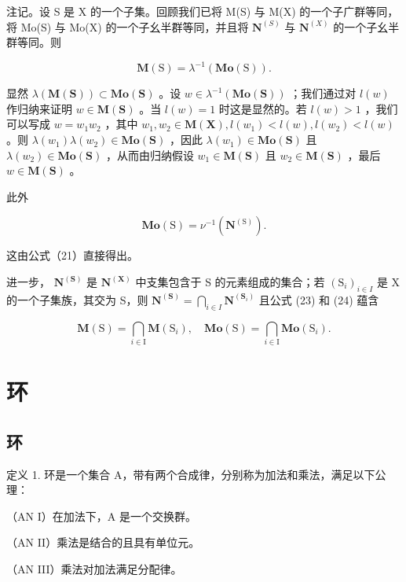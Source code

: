注记。设 S 是 X 的一个子集。回顾我们已将 M(S) 与 M(X) 的一个子广群等同，将 Mo(S) 与 Mo(X) 的一个子幺半群等同，并且将 \(\mathbf{N}^{(S)}\) 与 \(\mathbf{N}^{(X)}\) 的一个子幺半群等同。则

\[
\mathbf {M} (\mathrm{S}) = \lambda^ {- 1} (\mathbf {M o} (\mathrm{S})).\tag{23}
\]

显然 \(\lambda (\mathbf{M}(\mathbf{S}))\subset \mathbf{Mo}(\mathbf{S})\) 。设 \(w\in \lambda^{-1}(\mathbf{Mo}(\mathbf{S}))\) ；我们通过对 \(l(w)\) 作归纳来证明 \(w\in \mathbf{M}(\mathbf{S})\) 。当 \(l(w) = 1\) 时这是显然的。若 \(l(w) > 1\) ，我们可以写成 \(w = w_{1}w_{2}\) ，其中 \(w_{1},w_{2}\in \mathbf{M}(\mathbf{X}), l(w_{1}) <   l(w),l(w_{2}) <   l(w)\) 。则 \(\lambda (w_1)\lambda (w_2)\in \mathbf{Mo}(\mathbf{S})\) ，因此 \(\lambda (w_1)\in \mathbf{Mo}(\mathbf{S})\) 且 \(\lambda (w_2)\in \mathbf{Mo}(\mathbf{S})\) ，从而由归纳假设 \(w_{1}\in \mathbf{M}(\mathbf{S})\) 且 \(w_{2}\in \mathbf{M}(\mathbf{S})\) ，最后 \(w\in \mathbf{M}(\mathbf{S})\) 。

此外

\[
\mathbf {M o} (\mathrm{S}) = \nu^ {- 1} (\mathbf {N} ^ {(\mathrm{S})}).\tag{24}
\]

这由公式（21）直接得出。

进一步， \(\mathbf{N}^{(\mathbf{S})}\) 是 \(\mathbf{N}^{(\mathbf{X})}\) 中支集包含于 S 的元素组成的集合；若 \((\mathrm{S}_i)_{i\in I}\) 是 X 的一个子集族，其交为 S，则 \(\mathbf{N}^{(\mathbf{S})} = \bigcap_{i\in I}\mathbf{N}^{(\mathbf{S}_i)}\) 且公式 (23) 和 (24) 蕴含

\[
\mathbf {M} (\mathrm{S}) = \bigcap_ {i \in \mathrm{I}} \mathbf {M} (\mathrm{S} _ {i}), \quad \mathbf {M o} (\mathrm{S}) = \bigcap_ {i \in \mathrm{I}} \mathbf {M o} (\mathrm{S} _ {i}).\tag{25}
\]

\section{环}

\subsection{环}

定义 1. 环是一个集合 A，带有两个合成律，分别称为加法和乘法，满足以下公理：

（AN I）在加法下，A 是一个交换群。

（AN II）乘法是结合的且具有单位元。

（AN III）乘法对加法满足分配律。


